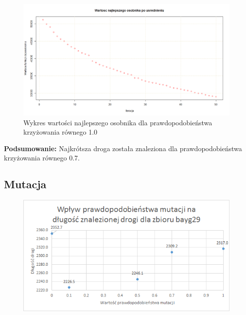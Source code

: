 \begin{figure}[H]
\centering

\includegraphics[scale=0.3]{IO_obrazy/US50_krz_1}
\caption{Wykres wartości najlepszego osobnika dla prawdopodobieństwa krzyżowania równego 1.0}
\end{figure}

\textbf{Podsumowanie:} Najkrótsza droga została znaleziona dla prawdopodobieństwa krzyżowania równego 0.7. 



\newpage

\subsection{Mutacja}


\begin{figure}[H]
\centering

\includegraphics[scale=0.9]{IO_obrazy/excel_bayg29_mut}
\end{figure}

